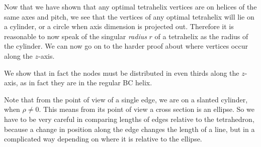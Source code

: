 \documentclass[review]{siamonline1116}
\begin{document}




Now that we have shown that any optimal tetrahelix vertices
are on helices of the same axes and pitch, we see that the vertices 
of any optimal tetrahelix will lie on a cylinder, or a circle when axis dimension
is projected out. Therefore it is reasonable to now speak of the singular \emph{radius} $r$
of a tetrahelix as the radius of the cylinder.
We can now go on to
the harder proof about where vertices occur along the $z$-axis.

 We show that in fact the nodes must be distributed in even thirds
 along the $z$-axis, as in fact they are in the regular BC helix.

 Note that from the point of view of a single edge, we are on a
 slanted cylinder, when $\rho \neq 0$.  This means from its point of
 view a cross section is an ellipse. So we have to be very careful in
 comparing lengths of edges relative to the tetrahedron, because a
 change in position along the edge changes the length of a line, but
 in a complicated way depending on where it is relative to the
 ellipse.
\end{document}
